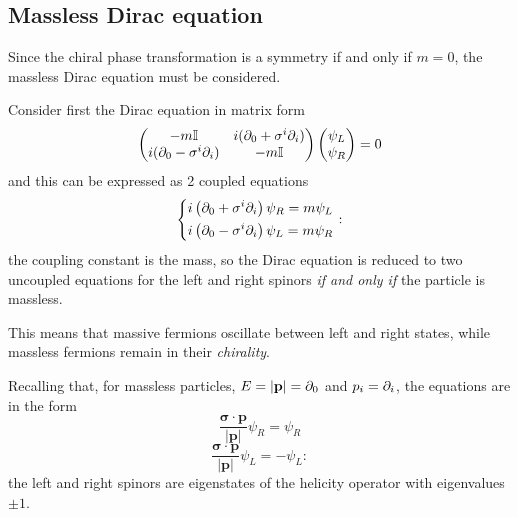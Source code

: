 \subsection{Massless Dirac equation}
Since the chiral phase transformation is a symmetry if and only if $m=0$,
the massless Dirac equation must be considered.

Consider first the Dirac equation in matrix form
$$
\begin{pmatrix}
    -m\mathbb{I}&i(\partial_0+\sigma^i\partial_i)\\
    i(\partial_0-\sigma^i\partial_i)&-m\mathbb{I}
\end{pmatrix}\begin{pmatrix}
\psi_L\\\psi_R
\end{pmatrix}
=0
$$
and this can be expressed as 2 coupled equations
$$\begin{dcases*}
i\left(\pd_0 + \sigma^i\pd_i\right)\psi_R = m\psi_L\\
i\left(\pd_0 - \sigma^i\pd_i\right)\psi_L = m\psi_R
\end{dcases*}:
$$
the coupling constant is the mass, so the Dirac equation is reduced
to two uncoupled equations for the left and right spinors \textit{if and only if}
the particle is massless.

This means that massive fermions oscillate between left and right states, while
massless fermions remain in their \textit{chirality}.

Recalling that, for massless particles, $E  =|\mathbf{p}| = \partial_0$
and $p_i = \partial_i$, the equations are
in the form
$$\frac{\mathbf{\sigma \cdot p}}{|\mathbf{p}|}\psi_R = \psi_R$$
$$\frac{\mathbf{\sigma\cdot p}}{|\mathbf{p}|}\psi_L =- \psi_L:$$
the left and right spinors are eigenstates of the helicity operator
with eigenvalues $\pm1$.

